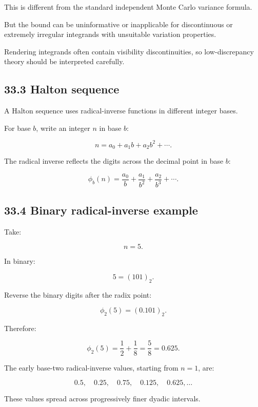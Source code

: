 This is different from the standard independent Monte Carlo variance formula.

But the bound can be uninformative or inapplicable for discontinuous or extremely irregular integrands with unsuitable variation properties.

Rendering integrands often contain visibility discontinuities, so low-discrepancy theory should be interpreted carefully.

\subsection{33.3 Halton sequence}\label{02-foundations-ii-ch031-halton-sequence}

\hypertarget{02-foundations-ii-ch031-halton-sequence}{}

A Halton sequence uses radical-inverse functions in different integer bases.

For base \(b\), write an integer \(n\) in base \(b\):

\[ n=a_0+a_1b+a_2b^2+\cdots. \]

The radical inverse reflects the digits across the decimal point in base \(b\):

\[ \boxed{ \phi_b(n)= \frac{a_0}{b}+ \frac{a_1}{b^2}+ \frac{a_2}{b^3}+\cdots }. \]

\subsection{33.4 Binary radical-inverse example}\label{02-foundations-ii-ch031-binary-radical-inverse-example}

\hypertarget{02-foundations-ii-ch031-binary-radical-inverse-example}{}

Take:

\[ n=5. \]

In binary:

\[ 5=(101)_2. \]

Reverse the binary digits after the radix point:

\[ \phi_2(5)=(0.101)_2. \]

Therefore:

\[ \boxed{ \phi_2(5)=\frac12+\frac18=\frac58=0.625 }. \]

The early base-two radical-inverse values, starting from \(n=1\), are:

\[ 0.5,\quad0.25,\quad0.75,\quad0.125,\quad0.625,\ldots \]

These values spread across progressively finer dyadic intervals.

